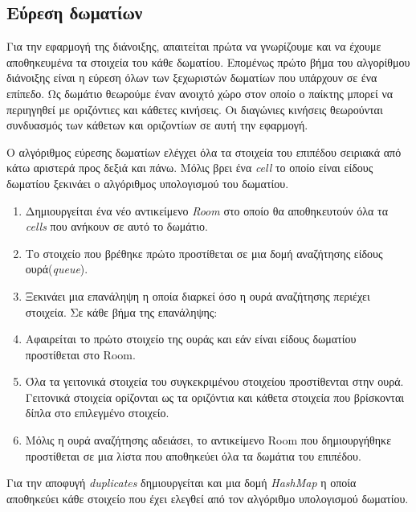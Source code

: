\subsection{Εύρεση δωματίων}
\par
Για την εφαρμογή της διάνοιξης, απαιτείται πρώτα να γνωρίζουμε και να έχουμε αποθηκευμένα τα στοιχεία του κάθε δωματίου. Επομένως πρώτο βήμα του αλγορίθμου διάνοιξης είναι η εύρεση όλων των ξεχωριστών δωματίων που υπάρχουν σε ένα επίπεδο. Ως δωμάτιο θεωρούμε έναν ανοιχτό χώρο στον οποίο ο παίκτης μπορεί να περιηγηθεί με οριζόντιες και κάθετες κινήσεις. Οι διαγώνιες κινήσεις θεωρούνται συνδυασμός των κάθετων και οριζοντίων σε αυτή την εφαρμογή.
\par
O αλγόριθμος εύρεσης δωματίων ελέγχει όλα τα στοιχεία του επιπέδου σειριακά από κάτω αριστερά προς δεξιά και πάνω. Μόλις βρει ένα \textit{cell} το οποίο είναι είδους δωματίου ξεκινάει ο αλγόριθμος υπολογισμού του δωματίου. 
\begin{enumerate}
\item Δημιουργείται ένα νέο αντικείμενο \textit{Room} στο οποίο θα αποθηκευτούν όλα τα \textit{cells} που ανήκουν σε αυτό το δωμάτιο.
\item Το στοιχείο που βρέθηκε πρώτο προστίθεται σε μια δομή αναζήτησης είδους ουρά(\textit{queue}).
\item Ξεκινάει μια επανάληψη η οποία διαρκεί όσο η ουρά αναζήτησης περιέχει στοιχεία. Σε κάθε βήμα της επανάληψης:
\item Αφαιρείται το πρώτο στοιχείο της ουράς και εάν είναι είδους δωματίου προστίθεται στο Room.
\item Όλα τα γειτονικά στοιχεία του συγκεκριμένου στοιχείου προστίθενται στην ουρά. Γειτονικά στοιχεία ορίζονται ως τα οριζόντια και κάθετα στοιχεία που βρίσκονται δίπλα στο επιλεγμένο στοιχείο.
\item Μόλις η ουρά αναζήτησης αδειάσει, το αντικείμενο Room που δημιουργήθηκε προστίθεται σε μια λίστα που αποθηκεύει όλα τα δωμάτια του επιπέδου.
\end{enumerate}
Για την αποφυγή \textit{duplicates} δημιουργείται και μια δομή \textit{HashMap} η οποία αποθηκεύει κάθε στοιχείο που έχει ελεγθεί από τον αλγόριθμο υπολογισμού δωματίου.

